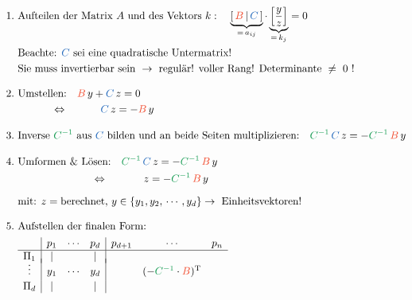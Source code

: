 \begin{align*}
    1.~&\text{Aufteilen der Matrix }A\text{ und des Vektors }k: \quad \underbrace{\left[\,{\color{RedOrange}B}\,|\,{\color{NavyBlue}C}\,\right]}_{=\,a_{ij}}\cdot\underbrace{\left[\frac{y}{z}\right]}_{=\,k_j} = 0 \\
       &\text{Beachte: } {\color{NavyBlue}C} \text{ sei eine quadratische Untermatrix!}\\
       &\text{Sie muss invertierbar sein }\rightarrow\text{ regulär! voller Rang! Determinante }\neq\text{ 0 !}\\[2.0ex]
    2.~&\text{Umstellen:} \quad {\color{RedOrange}B}\,y + {\color{NavyBlue}C}\,z = 0 \\
       &\hspace{11.2mm}\Leftrightarrow\hspace{11mm} {\color{NavyBlue}C}\,z = -{\color{RedOrange}B}\,y\\[2.0ex]
    3.~&\text{Inverse }{\color{ForestGreen}C^{-1}}\text{ aus }{\color{NavyBlue}C}\text{ bilden und an beide Seiten multiplizieren:} \quad {\color{ForestGreen}C^{-1}}\,{\color{NavyBlue}C}\,z = -{\color{ForestGreen}C^{-1}}\,{\color{RedOrange}B}\,y \\[2.0ex]
    4.~&\text{Umformen \& Lösen:} \quad {\color{ForestGreen}C^{-1}}\,{\color{NavyBlue}C}\,z = -{\color{ForestGreen}C^{-1}}\,{\color{RedOrange}B}\,y\\
       &\hspace{24.6mm}\Leftrightarrow\hspace{12mm} z = -{\color{ForestGreen}C^{-1}}\,{\color{RedOrange}B}\,y\\[1.5ex]
       &\text{mit: } z = \text{berechnet, } y \in \left\{y_1, y_2,\,\cdots, y_d\right\} \rightarrow~\text{Einheitsvektoren!} \\[2.0ex]
    5.~&\text{Aufstellen der finalen Form:}\\
       &\begin{array}{c|c c c|c c c}
                   & p_1 & \cdots & p_d & p_{d+1} & \cdots                                                           & p_n \\ \hline
            \Pi_1  &  |  &        &  |  &         &                                                                  &     \\[-1.0ex]
            \vdots & y_1 & \cdots & y_d &         & (-{\color{ForestGreen}C^{-1}}\cdot{\color{RedOrange}B})^\text{T} &     \\[0.5ex]
            \Pi_d  &  |  &        &  |  &         &                                                                  &     

\end{array}
\end{align*}
